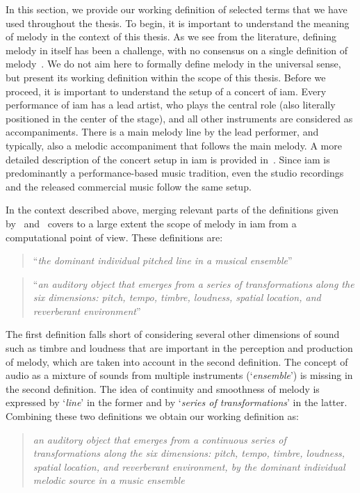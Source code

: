 In this section, we provide our working definition of selected terms that we have used throughout the thesis. To begin, it is important to understand the meaning of melody in the context of this thesis. As we see from the literature, defining melody in itself has been a challenge, with no consensus on a single definition of melody~\citep{gomez2003melody,salamon:phd:13}. We do not aim here to formally define melody in the universal sense, but present its working definition within the scope of this thesis. Before we proceed, it is important to understand the setup of a concert of \gls{iam}. Every performance of \gls{iam} has a lead artist, who plays the central role (also literally positioned in the center of the stage), and all other instruments are considered as accompaniments. There is a main melody line by the lead performer, and typically, also a melodic accompaniment that follows the main melody. A more detailed description of the concert setup in \gls{iam} is provided in~. Since \gls{iam} is predominantly a performance-based music tradition, even the studio recordings and the released commercial music follow the same setup.

In the context described above, merging relevant parts of the definitions given by~\cite{paiva2006melody} and~\cite{levitin2002memory} covers to a large extent the scope of melody in \gls{iam} from a computational point of view. These definitions are:

\blockquote[\cite{paiva2006melody}]{``\textit{the dominant individual pitched line in a musical ensemble}''}

\blockquote[\cite{levitin2002memory}]{``\textit{an auditory object that emerges from a series of transformations along the six dimensions: pitch, tempo, timbre, loudness, spatial location, and reverberant environment}''}

The first definition falls short of considering several other dimensions of sound such as timbre and loudness that are important in the perception and production of melody, which are taken into account in the second definition. The concept of audio as a mixture of sounds from multiple instruments (`\textit{ensemble}') is missing in the second definition. The idea of continuity and smoothness of melody is expressed by `\textit{line}' in the former and by `\textit{series of transformations}' in the latter. Combining these two definitions we obtain our working definition as: 

\blockquote{\textit{an auditory object that emerges from a continuous series of transformations along the six dimensions: pitch, tempo, timbre, loudness, spatial location, and reverberant environment, by the dominant individual melodic source in a music ensemble}}. 

